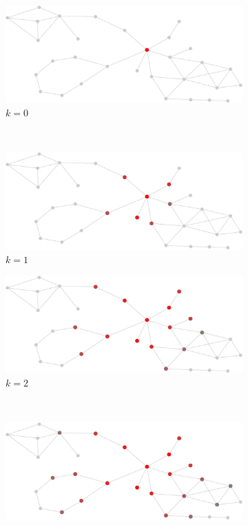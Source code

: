 \documentclass[12pt]{report}
\begin{document}
\begin{figure}[tpb]
  \centering
  \begin{subfigure}[b]{0.5\textwidth}
    \includegraphics[width=\textwidth]{frame0}
		\caption{$k=0$}
  \end{subfigure}%
  ~
  \begin{subfigure}[b]{0.5\textwidth}
    \includegraphics[width=\textwidth]{frame1}
    \caption{$k=1$}
  \end{subfigure}
  \begin{subfigure}[b]{0.5\textwidth}
    \includegraphics[width=\textwidth]{frame2}
		\caption{$k=2$}
  \end{subfigure}%
  ~
  \begin{subfigure}[b]{0.5\textwidth}
    \includegraphics[width=\textwidth]{frame3}

\end{subfigure}
\end{figure}
\end{document}

